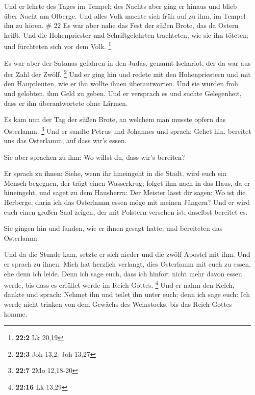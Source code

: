  Und er lehrte des Tages im Tempel; des Nachts aber ging er
hinaus und blieb über Nacht am Ölberge.  Und alles Volk
machte sich früh auf zu ihm, im Tempel ihn zu hören. \# 22 
Es war aber nahe das Fest der süßen Brote, das da Ostern heißt.
 Und die Hohenpriester und Schriftgelehrten trachteten, wie
sie ihn töteten; und fürchteten sich vor dem Volk. \footnote{\textbf{22:2}
  Lk 20,19}

 Es war aber der Satanas gefahren in den Judas, genannt
Ischariot, der da war aus der Zahl der Zwölf. \footnote{\textbf{22:3}
  Joh 13,2; Joh 13,27}  Und er ging hin und redete mit den
Hohenpriestern und mit den Hauptleuten, wie er ihn wollte ihnen
überantworten.  Und sie wurden froh und gelobten, ihm Geld
zu geben.  Und er versprach es und suchte Gelegenheit, dass
er ihn überantwortete ohne Lärmen.

 Es kam nun der Tag der süßen Brote, an welchem man musste
opfern das Osterlamm. \footnote{\textbf{22:7} 2Mo 12,18-20} 
Und er sandte Petrus und Johannes und sprach: Gehet hin, bereitet uns
das Osterlamm, auf dass wir's essen.

 Sie aber sprachen zu ihm: Wo willst du, dass wir's
bereiten?

 Er sprach zu ihnen: Siehe, wenn ihr hineingeht in die
Stadt, wird euch ein Mensch begegnen, der trägt einen Wasserkrug; folget
ihm nach in das Haus, da er hineingeht,  und saget zu dem
Hausherrn: Der Meister lässt dir sagen: Wo ist die Herberge, darin ich
das Osterlamm essen möge mit meinen Jüngern?  Und er wird
euch einen großen Saal zeigen, der mit Polstern versehen ist; daselbst
bereitet es.

 Sie gingen hin und fanden, wie er ihnen gesagt hatte, und
bereiteten das Osterlamm.

 Und da die Stunde kam, setzte er sich nieder und die zwölf
Apostel mit ihm.  Und er sprach zu ihnen: Mich hat herzlich
verlangt, dies Osterlamm mit euch zu essen, ehe denn ich leide.
 Denn ich sage euch, dass ich hinfort nicht mehr davon
essen werde, bis dass es erfüllet werde im Reich Gottes. \footnote{\textbf{22:16}
  Lk 13,29}  Und er nahm den Kelch, dankte und sprach:
Nehmet ihn und teilet ihn unter euch;  denn ich sage euch:
Ich werde nicht trinken von dem Gewächs des Weinstocks, bis das Reich
Gottes komme.

